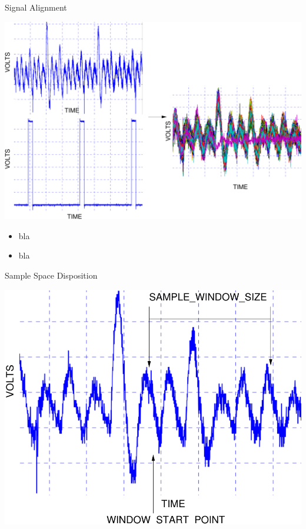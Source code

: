 \documentclass[final]{beamer}
\begin{document}
\begin{frame}[fragile]{}
\begin{columns}[t]
\begin{column}{.31\linewidth}
\begin{block}{Signal Alignment}
\begin{minipage}[t]{0.49\linewidth}
          \includegraphics[scale=0.5]{../figures/signalAlignment}
        \end{minipage}%
        \begin{minipage}[t]{0.49\linewidth}
         \begin{itemize}
           \item bla
           \item bla
         \end{itemize} 
        \end{minipage}
       \end{block}
       \begin{block}{Sample Space Disposition}
        \begin{minipage}[t]{0.49\linewidth}%
          \includegraphics[scale=0.7]{../figures/sampleSpaceDisp}\hspace{-2ex}

\end{minipage}
\end{block}
\end{column}
\end{columns}
\end{frame}
\end{document}
